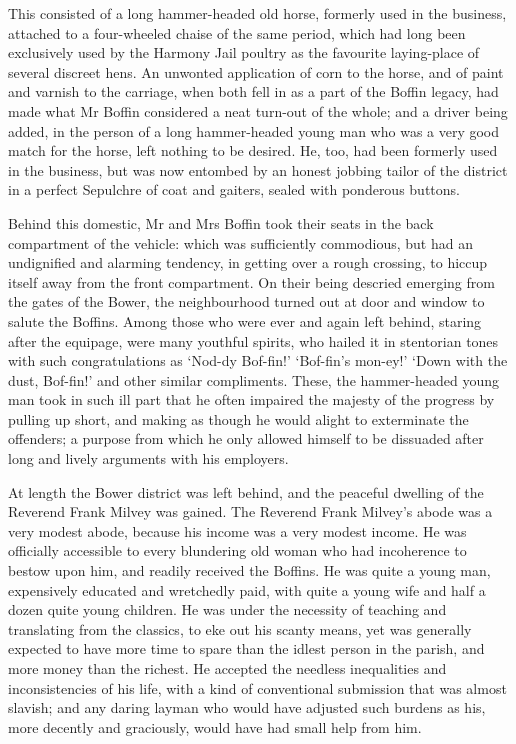This consisted of a long hammer-headed old horse, formerly used in the
business, attached to a four-wheeled chaise of the same period, which
had long been exclusively used by the Harmony Jail poultry as the
favourite laying-place of several discreet hens. An unwonted application
of corn to the horse, and of paint and varnish to the carriage, when
both fell in as a part of the Boffin legacy, had made what Mr Boffin
considered a neat turn-out of the whole; and a driver being added, in
the person of a long hammer-headed young man who was a very good match
for the horse, left nothing to be desired. He, too, had been formerly
used in the business, but was now entombed by an honest jobbing tailor
of the district in a perfect Sepulchre of coat and gaiters, sealed with
ponderous buttons.

Behind this domestic, Mr and Mrs Boffin took their seats in the back
compartment of the vehicle: which was sufficiently commodious, but had
an undignified and alarming tendency, in getting over a rough crossing,
to hiccup itself away from the front compartment. On their being
descried emerging from the gates of the Bower, the neighbourhood turned
out at door and window to salute the Boffins. Among those who were ever
and again left behind, staring after the equipage, were many youthful
spirits, who hailed it in stentorian tones with such congratulations as
‘Nod-dy Bof-fin!’ ‘Bof-fin’s mon-ey!’ ‘Down with the dust, Bof-fin!’ and
other similar compliments. These, the hammer-headed young man took in
such ill part that he often impaired the majesty of the progress by
pulling up short, and making as though he would alight to exterminate
the offenders; a purpose from which he only allowed himself to be
dissuaded after long and lively arguments with his employers.

At length the Bower district was left behind, and the peaceful dwelling
of the Reverend Frank Milvey was gained. The Reverend Frank Milvey’s
abode was a very modest abode, because his income was a very modest
income. He was officially accessible to every blundering old woman who
had incoherence to bestow upon him, and readily received the Boffins.
He was quite a young man, expensively educated and wretchedly paid, with
quite a young wife and half a dozen quite young children. He was under
the necessity of teaching and translating from the classics, to eke out
his scanty means, yet was generally expected to have more time to spare
than the idlest person in the parish, and more money than the richest.
He accepted the needless inequalities and inconsistencies of his life,
with a kind of conventional submission that was almost slavish; and any
daring layman who would have adjusted such burdens as his, more decently
and graciously, would have had small help from him.

